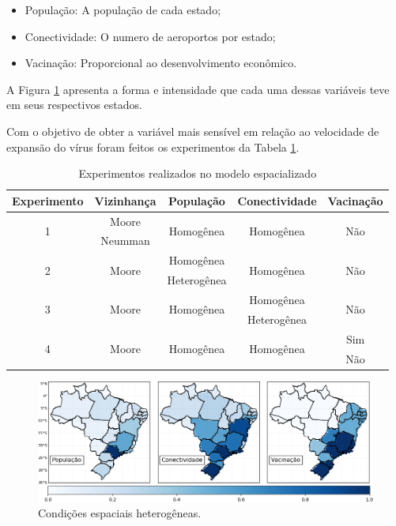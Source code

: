 \documentclass[a4paper,12pt]{article}
\begin{document}
\begin{itemize}
    \item População: A população de cada estado;
    \item Conectividade: O numero de aeroportos por estado;
    \item Vacinação: Proporcional ao desenvolvimento econômico.
\end{itemize}

A Figura \ref{figure:CI} apresenta a forma e intensidade que cada uma dessas variáveis teve em seus respectivos estados.

Com o objetivo de obter a variável mais sensível em relação ao velocidade de expansão do vírus foram feitos os experimentos da Tabela \ref{tab:exp}.

\begin{table}[ht]
 \caption{Experimentos realizados no modelo espacializado}
 \centering
 \begin{tabular}{c|c|c|c|c}
  Experimento & Vizinhança & População & Conectividade & Vacinação \\
  \hline
  \multirow{2}{*}{1} & Moore & \multirow{2}{*}{Homogênea} & \multirow{2}{*}{Homogênea} & \multirow{2}{*}{Não} \\
   & Neumman &  &  &  \\
  \hline
  \multirow{2}{*}{2} & \multirow{2}{*}{Moore} & Homogênea & \multirow{2}{*}{Homogênea} & \multirow{2}{*}{Não} \\
  &  & Heterogênea &  &  \\
  \hline
  \multirow{2}{*}{3} & \multirow{2}{*}{Moore} & \multirow{2}{*}{Homogênea} & Homogênea & \multirow{2}{*}{Não} \\
  &  &  & Heterogênea &  \\
  \hline
  \multirow{2}{*}{4} & \multirow{2}{*}{Moore} & \multirow{2}{*}{Homogênea} & \multirow{2}{*}{Homogênea} & Sim \\
  &  &  &  & Não \\
\end{tabular}
\label{tab:exp}
\end{table}

\begin{figure}[!ht]
 \begin{center}
  \includegraphics[width=1\linewidth]{fig/variaveis_espaciais.png}
 \end{center}
 \caption{Condições espaciais heterogêneas.}
\label{figure:CI}
\end{figure}
\end{document}
